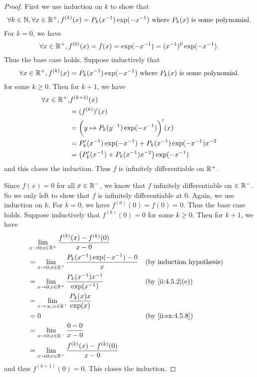 \begin{proof}
  First we use induction on \(k\) to show that
  \[
    \forall k \in \mathbb{N}, \forall x \in \mathbb{R}^+, f^{(k)}(x) = P_k(x^{-1}) \exp(-x^{-1}) \text{ where } P_k(x) \text{ is some polynomial}.
  \]
  For \(k = 0\), we have
  \[
    \forall x \in \mathbb{R}^+, f^{(0)}(x) = f(x) = \exp(-x^{-1}) = (x^{-1})^0 \exp(-x^{-1}).
  \]
  Thus the base case holds.
  Suppose inductively that
  \[
    \forall x \in \mathbb{R}^+, f^{(k)}(x) = P_k(x^{-1}) \exp(-x^{-1}) \text{ where } P_k(x) \text{ is some polynomial}.
  \]
  for some \(k \geq 0\).
  Then for \(k + 1\), we have
  \begin{align*}
    \forall x \in \mathbb{R}^+, & f^{(k + 1)}(x)                                                  \\
                        & = (f^{(k)})'(x)                                                 \\
                        & = \bigg(y \mapsto P_k(y^{-1}) \exp(-x^{-1})\bigg)'(x)           \\
                        & = P_k'(x^{-1}) \exp(-x^{-1}) + P_k(x^{-1}) \exp(-x^{-1}) x^{-2} \\
                        & = \big(P_k'(x^{-1}) + P_k(x^{-1}) x^{-2}\big) \exp(-x^{-1})
  \end{align*}
  and this closes the induction.
  Thus \(f\) is infinitely differentiable on \(\mathbb{R}^+\).

  Since \(f(x) = 0\) for all \(x \in \mathbb{R}^-\), we know that \(f\) infinitely differentiable on \(\in \mathbb{R}^-\).
  So we only left to show that \(f\) is infinitely differentiable at \(0\).
  Again, we use induction on \(k\).
  For \(k = 0\), we have \(f^{(0)}(0) = f(0) = 0\).
  Thus the base case holds.
  Suppose inductively that \(f^{(k)}(0) = 0\) for some \(k \geq 0\).
  Then for \(k + 1\), we have
  \begin{align*}
     & \lim_{x \to 0 ; x \in \R^+} \dfrac{f^{(k)}(x) - f^{(k)}(0)}{x - 0}                           \\
     & = \lim_{x \to 0 ; x \in \R^+} \dfrac{P_k(x^{-1}) \exp(-x^{-1}) - 0}{x} &  & \byIH            \\
     & = \lim_{x \to 0 ; x \in \R^+} \dfrac{P_k(x^{-1}) x^{-1}}{\exp(x^{-1})} &  & \by{ii:4.5.2}[e] \\
     & = \lim_{x \to \infty ; x \in \R^+} \dfrac{P_k(x) x}{\exp(x)}                                 \\
     & = 0                                                                    &  & \by{ii:ex:4.5.8} \\
     & = \lim_{x \to 0 ; x \in \R^-} \dfrac{0 - 0}{x - 0}                                           \\
     & = \lim_{x \to 0 ; x \in \R^-} \dfrac{f^{(k)}(x) - f^{(k)}(0)}{x - 0}
  \end{align*}
  and thus \(f^{(k + 1)}(0) = 0\).
  This closes the induction.


\end{proof}
